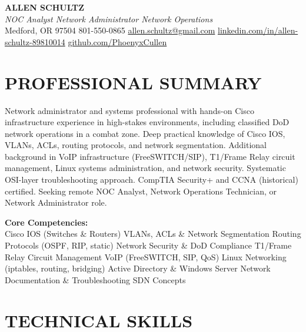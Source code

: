 \documentclass[9pt,letterpaper]{extarticle}
\begin{document}
\begin{center}
  {\LARGE\bfseries\color{accent} ALLEN SCHULTZ}\\[3pt]
  {\normalsize\itshape NOC Analyst \textbar{} Network Administrator \textbar{} Network Operations}\\[4pt]
  {\small
    Medford, OR 97504 \textbar{} 801-550-0865 \textbar{}
    \href{mailto:allen.schultz@gmail.com}{allen.schultz@gmail.com} \textbar{}
    \href{https://linkedin.com/in/allen-schultz-89810014}{linkedin.com/in/allen-schultz-89810014} \textbar{}
    \href{https://github.com/PhoenyxCullen}{github.com/PhoenyxCullen}
  }
\end{center}

\section*{PROFESSIONAL SUMMARY}

Network administrator and systems professional with hands-on Cisco infrastructure experience in high-stakes environments, including classified DoD network operations in a combat zone. Deep practical knowledge of Cisco IOS, VLANs, ACLs, routing protocols, and network segmentation. Additional background in VoIP infrastructure (FreeSWITCH/SIP), T1/Frame Relay circuit management, Linux systems administration, and network security. Systematic OSI-layer troubleshooting approach. CompTIA Security+ and CCNA (historical) certified. Seeking remote NOC Analyst, Network Operations Technician, or Network Administrator role.

\smallskip
\textbf{Core Competencies:}\\
Cisco IOS (Switches \& Routers) \textbullet{}
VLANs, ACLs \& Network Segmentation \textbullet{}
Routing Protocols (OSPF, RIP, static) \textbullet{}
Network Security \& DoD Compliance \textbullet{}
T1/Frame Relay Circuit Management \textbullet{}
VoIP (FreeSWITCH, SIP, QoS) \textbullet{}
Linux Networking (iptables, routing, bridging) \textbullet{}
Active Directory \& Windows Server \textbullet{}
Network Documentation \& Troubleshooting \textbullet{}
SDN Concepts

\section*{TECHNICAL SKILLS}
\end{document}
